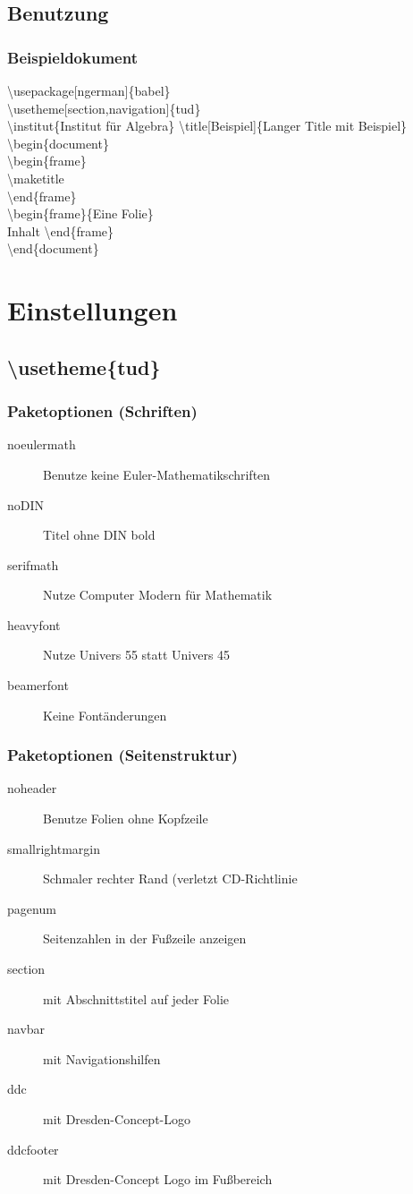\documentclass[presentation,t]{beamer}
\begin{document}
\subsection{Benutzung}
\label{sec-1-2}
\begin{frame}
\frametitle{Beispieldokument}
\label{sec-1-2-1}

\textbackslash usepackage[ngerman]\{babel\}\\
\textbackslash usetheme[section,navigation]\{tud\}\\
\textbackslash institut\{Institut f\"ur Algebra\}%
\textbackslash title[Beispiel]\{Langer Title mit Beispiel\}
\textbackslash begin\{document\}\\
\textbackslash begin\{frame\}\\
\textbackslash maketitle\\
\textbackslash end\{frame\}\\
\textbackslash begin\{frame\}\{Eine Folie\}\\
Inhalt
\textbackslash end\{frame\}\\
\textbackslash end\{document\}\\
\end{frame}
\section{Einstellungen}
\label{sec-2}
\subsection{\textbackslash usetheme\{tud\}}
\label{sec-2-1}
\begin{frame}
\frametitle{Paketoptionen (Schriften)}
\label{sec-2-1-1}

\begin{description}
\item[noeulermath] Benutze keine Euler-Mathematikschriften
\item[noDIN] Titel ohne DIN bold
\item[serifmath] Nutze Computer Modern für Mathematik
\item[heavyfont] Nutze Univers 55 statt Univers 45
\item[beamerfont] Keine Fontänderungen
\end{description}
\end{frame}
\begin{frame}
\frametitle{Paketoptionen (Seitenstruktur)}
\label{sec-2-1-2}

\begin{description}
\item[noheader] Benutze Folien ohne Kopfzeile
\item[smallrightmargin] Schmaler rechter Rand (verletzt CD-Richtlinie
\item[pagenum] Seitenzahlen in der Fußzeile anzeigen
\item[section] mit Abschnittstitel auf jeder Folie
\item[navbar] mit Navigationshilfen
\item[ddc] mit Dresden-Concept-Logo
\item[ddcfooter] mit Dresden-Concept Logo im Fußbereich
\end{description}
\end{frame}
\end{document}
